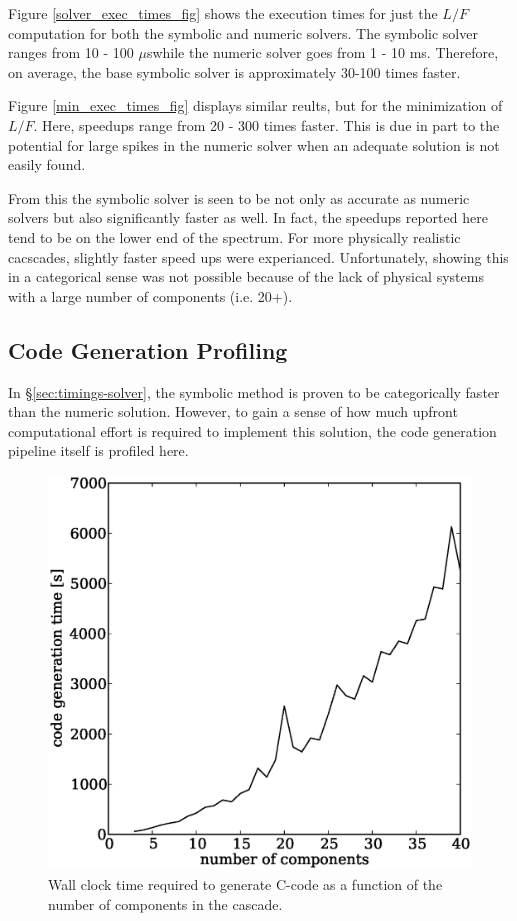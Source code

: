 \documentclass[preprint,12pt]{elsarticle}
\newcommand{\us}[0]{$\mu$s}
\begin{document}
Figure \ref{solver_exec_times_fig} shows the execution times for just the $L/F$ 
computation for both the symbolic and numeric solvers.  The symbolic solver ranges
from 10 - 100 \us while the numeric solver goes from 1 - 10 ms.  Therefore, 
on average, the base symbolic solver is approximately 30-100 times faster.

Figure \ref{min_exec_times_fig} displays similar reults, but for the minimization
of $L/F$.  Here, speedups range from 20 - 300 times faster.  This is due in part 
to the potential for large spikes in the numeric solver when an adequate solution 
is not easily found.  

From this the symbolic solver is seen to be not only as accurate as numeric solvers
but also significantly faster as well.  In fact, the speedups reported here tend
to be on the lower end of the spectrum.  For more physically realistic cacscades, 
slightly faster speed ups were experianced.  Unfortunately, showing this in a 
categorical sense was not possible because of the lack of physical systems with a
large number of components (i.e. 20+).


\subsection{Code Generation Profiling}
\label{sec:codegen-prof}
In \S\ref{sec:timings-solver}, the symbolic method is proven to be categorically
faster than the numeric solution.  However, to gain a sense of how much upfront 
computational effort is required to implement this solution, the code generation 
pipeline itself is profiled here.

\begin{figure}[htpb]
\begin{center}
\includegraphics[scale=0.5]{codegen_times.eps}
\caption{Wall clock time required to generate C-code as a function of the 
    number of components in the cascade.}
\label{codegen_times_fig}
\end{center}
\end{figure}
\end{document}

